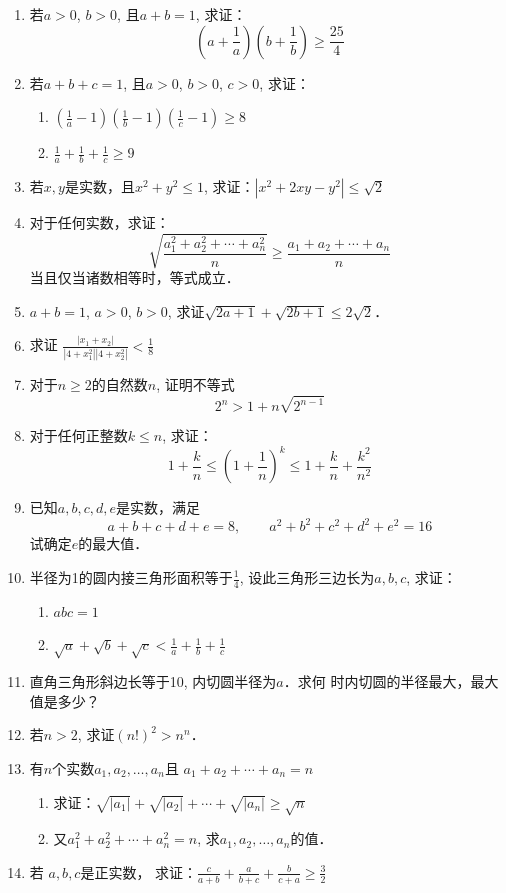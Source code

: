 \begin{enumerate}
求证：$\sqrt{a^2+b^2}+\sqrt{b^2+c^2}+\sqrt{c^2+a^2}\ge 3\sqrt{2}(abc)^{\tfrac{1}{3}}=6\sqrt{2}$

\item 若$a>0$, $b>0$, 且$a+b=1$, 
求证：\[\left(a+\frac{1}{a}\right)\left(b+\frac{1}{b}\right)\ge \frac{25}{4}\]

\item 若$a+b+c=1$, 且$a>0$, $b>0$, $c>0$, 求证：
\begin{enumerate}
    \item $\left(\frac{1}{a}-1\right)\left(\frac{1}{b}-1\right)\left(\frac{1}{c}-1\right)\ge 8$
    \item $\frac{1}{a}+\frac{1}{b}+\frac{1}{c}\ge 9$
\end{enumerate}

\item 若$x,y$是实数，且$x^2+y^2\le 1$,
求证：$|x^2+2xy-y^2|\le \sqrt{2}$

\item 对于任何实数，求证：
\[\sqrt{\frac{a_1^2+a_2^2+\cdots+a_n^2}{n}}\ge \frac{a_1+a_2+\cdots+a_n}{n}\]
当且仅当诸数相等时，等式成立．
\item $a+b=1$, $a>0$, $b>0$, 求证$\sqrt{2a+1}+\sqrt{2b+1}\le 2\sqrt{2}$．
\item 求证
$\frac{|x_1+x_2|}{|4+x_1^2| |4+x_2^2|}<\frac{1}{8}$
\item 对于$n\ge 2$的自然数$n$, 证明不等式
$$2^n>1+n\sqrt{2^{n-1}}$$
\item 对于任何正整数$k\le n$, 求证：
\[1+\frac{k}{n}\le \left(1+\frac{1}{n}\right)^k\le 1+\frac{k}{n}+\frac{k^2}{n^2}\]
\item 已知$a,b,c,d,e$是实数，满足
\[a+b+c+d+e=8,\qquad a^2+b^2+c^2+d^2+e^2=16\]
试确定$e$的最大值．
\item 半径为1的圆内接三角形面积等于$\frac{1}{4}$,
设此三角形三边长为$a,b,c$, 求证：
\begin{enumerate}
    \item $abc=1$
    \item $\sqrt{a}+\sqrt{b}+\sqrt{c}<\frac{1}{a}+\frac{1}{b}+\frac{1}{c}$
\end{enumerate}

\item 直角三角形斜边长等于10, 内切圆半径为$a$．求何
时内切圆的半径最大，最大值是多少？
\item 若$n>2$, 求证$(n!)^2>n^n$．
\item 有$n$个实数$a_1,a_2,\ldots,a_n$且
$a_1+a_2+\cdots+a_n=n$
\begin{enumerate}
    \item 求证：$\sqrt{|a_1|}+\sqrt{|a_2|}+\cdots+\sqrt{|a_n|}\ge \sqrt{n}$
    \item 又$a^2_1+a_2^2+\cdots+a^2_n=n$, 
求$a_1,a_2,\ldots,a_n$的值．
\end{enumerate}

\item 若 $a,b,c$是正实数，
求证：$\frac{c}{a+b}+\frac{a}{b+c}+\frac{b}{c+a}\ge \frac{3}{2}$
\end{enumerate}


